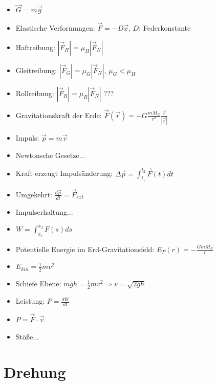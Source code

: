 \documentclass[a4paper,10pt, fleqn]{article}
\begin{document}
\begin{itemize}
\item $\vec{G} = m\vec{g}$
\item Elastische Verformungen: $\vec{F} = -D\vec{x}$, $D$: Federkonstante
\item Haftreibung: $|\vec{F}_H| = \mu_H |\vec{F}_N|$
\item Gleitreibung: $|\vec{F}_G| = \mu_G |\vec{F}_N|$, $\mu_G < \mu_H$
\item Rollreibung: $|\vec{F}_R| = \mu_R |\vec{F}_N|$ ???
\item Gravitationskraft der Erde: $\vec{F}(\vec{r}) = -G\frac{mM_E}{r^2} \frac{\vec{r}}{|\vec{r}|}$
\item Impuls: $\vec{p} = m \vec{v}$
\item Newtonsche Gesetze...
\item Kraft erzeugt Impulsänderung: $\Delta \vec{p} = \int_{t_1}^{t_2}\vec{F}(t)dt$
\item Umgekehrt: $\frac{d\vec{p}}{dt} = \vec{F}_{ext}$
\item Impulserhaltung...
\item $W = \int_{x_1}^{x_2}F(s)ds$
\item Potentielle Energie im Erd-Gravitationsfeld: $E_P(r) = -\frac{GmM_E}{r}$
\item $E_{kin} = \frac{1}{2}mv^2$
\item Schiefe Ebene: $mgh = \frac{1}{2}mv^2 \Rightarrow v = \sqrt{2gh}$
\item Leistung: $P = \frac{dW}{dt}$
\item $P = \vec{F} \cdot \vec{v}$
\item Stöße...
\end{itemize}

\section{Drehung}
\label{sec:drehung}
\end{document}
